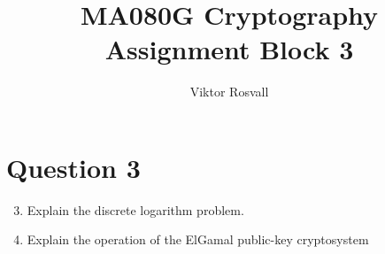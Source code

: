 \documentclass[12pt]{article}
\title{MA080G Cryptography Assignment Block 3}
\author{Viktor Rosvall}
\begin{document}
	\maketitle
	
	\section*{Question 3}
	\renewcommand{\theenumi}{\alph{enumi}}
	\renewcommand{\theenumii}{\roman{enumii}}
	\begin{enumerate}
		\setcounter{enumi}{2}
		\item Explain the discrete logarithm problem.
		
		\item Explain the operation of the ElGamal public-key cryptosystem
	\end{enumerate}	
\end{document}
